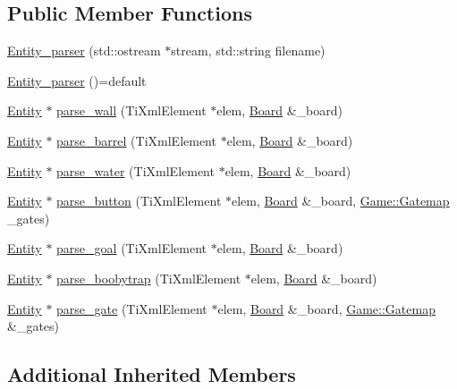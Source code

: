 \subsection*{Public Member Functions}
\begin{DoxyCompactItemize}
\item 
\hyperlink{class_entity__parser_ae71a89ee9d79647da978187f08c69b33}{Entity\-\_\-parser} (std\-::ostream $\ast$stream, std\-::string filename)
\item 
\hyperlink{class_entity__parser_a3efc9df13b6fd109315f4c6f36a76375}{Entity\-\_\-parser} ()=default
\item 
\hyperlink{class_entity}{Entity} $\ast$ \hyperlink{class_entity__parser_aba961cfb05c2e7d12648804363d11bb5}{parse\-\_\-wall} (Ti\-Xml\-Element $\ast$elem, \hyperlink{class_board}{Board} \&\-\_\-board)
\item 
\hyperlink{class_entity}{Entity} $\ast$ \hyperlink{class_entity__parser_a9c8e42b25b924483e8355bda85a603f2}{parse\-\_\-barrel} (Ti\-Xml\-Element $\ast$elem, \hyperlink{class_board}{Board} \&\-\_\-board)
\item 
\hyperlink{class_entity}{Entity} $\ast$ \hyperlink{class_entity__parser_a8c67bd953a6fdde2c21163184a7522cd}{parse\-\_\-water} (Ti\-Xml\-Element $\ast$elem, \hyperlink{class_board}{Board} \&\-\_\-board)
\item 
\hyperlink{class_entity}{Entity} $\ast$ \hyperlink{class_entity__parser_aa04c27556fdd6bb9586c8892904888d7}{parse\-\_\-button} (Ti\-Xml\-Element $\ast$elem, \hyperlink{class_board}{Board} \&\-\_\-board, \hyperlink{class_game_a3ac788aaa1e70509a9b9745acd17a8b5}{Game\-::\-Gatemap} \-\_\-gates)
\item 
\hyperlink{class_entity}{Entity} $\ast$ \hyperlink{class_entity__parser_a011968c051d36dbbeff3315ce475e176}{parse\-\_\-goal} (Ti\-Xml\-Element $\ast$elem, \hyperlink{class_board}{Board} \&\-\_\-board)
\item 
\hyperlink{class_entity}{Entity} $\ast$ \hyperlink{class_entity__parser_af6bb13a80634bd9c7328786d79fe3231}{parse\-\_\-boobytrap} (Ti\-Xml\-Element $\ast$elem, \hyperlink{class_board}{Board} \&\-\_\-board)
\item 
\hyperlink{class_entity}{Entity} $\ast$ \hyperlink{class_entity__parser_ac4792b94c41bde103925ae866cb60b6c}{parse\-\_\-gate} (Ti\-Xml\-Element $\ast$elem, \hyperlink{class_board}{Board} \&\-\_\-board, \hyperlink{class_game_a3ac788aaa1e70509a9b9745acd17a8b5}{Game\-::\-Gatemap} \&\-\_\-gates)
\end{DoxyCompactItemize}
\subsection*{Additional Inherited Members}


